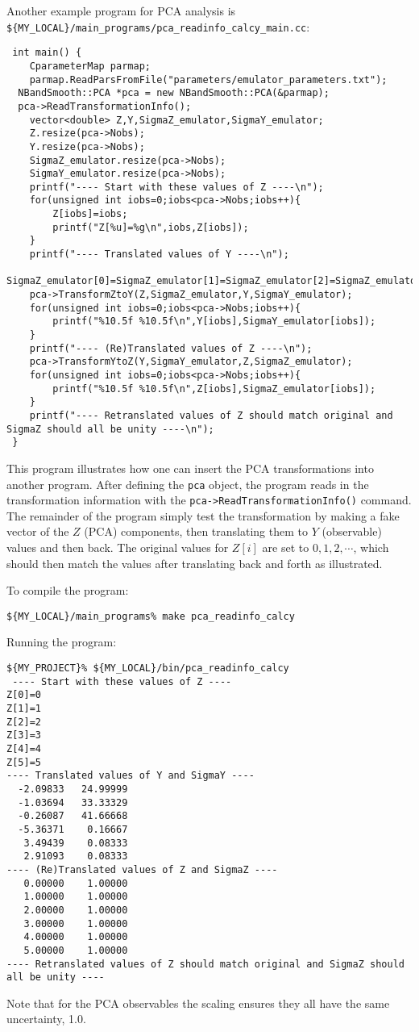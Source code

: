 \documentclass[UserManual.tex]{subfiles}
\begin{document}
Another example program for PCA analysis is {\tt \$\{MY\_LOCAL\}/main\_programs/pca\_readinfo\_calcy\_main.cc}:
{\tt\begin{verbatim}
 int main() {
	CparameterMap parmap;
	parmap.ReadParsFromFile("parameters/emulator_parameters.txt");
  NBandSmooth::PCA *pca = new NBandSmooth::PCA(&parmap);
  pca->ReadTransformationInfo();
	vector<double> Z,Y,SigmaZ_emulator,SigmaY_emulator;
	Z.resize(pca->Nobs);
	Y.resize(pca->Nobs);
	SigmaZ_emulator.resize(pca->Nobs);
	SigmaY_emulator.resize(pca->Nobs);
	printf("---- Start with these values of Z ----\n");
	for(unsigned int iobs=0;iobs<pca->Nobs;iobs++){
		Z[iobs]=iobs;
		printf("Z[%u]=%g\n",iobs,Z[iobs]);
	}
	printf("---- Translated values of Y ----\n");
	SigmaZ_emulator[0]=SigmaZ_emulator[1]=SigmaZ_emulator[2]=SigmaZ_emulator[3]=SigmaZ_emulator[4]=SigmaZ_emulator[5]=1.0;	
	pca->TransformZtoY(Z,SigmaZ_emulator,Y,SigmaY_emulator);
	for(unsigned int iobs=0;iobs<pca->Nobs;iobs++){
		printf("%10.5f %10.5f\n",Y[iobs],SigmaY_emulator[iobs]);
	}
	printf("---- (Re)Translated values of Z ----\n");
	pca->TransformYtoZ(Y,SigmaY_emulator,Z,SigmaZ_emulator);
	for(unsigned int iobs=0;iobs<pca->Nobs;iobs++){
		printf("%10.5f %10.5f\n",Z[iobs],SigmaZ_emulator[iobs]);
	}
	printf("---- Retranslated values of Z should match original and SigmaZ should all be unity ----\n");
 }
\end{verbatim}}
This program illustrates how one can insert the PCA transformations into another program. After defining the {\tt pca} object, the program reads in the transformation information with the {\tt pca->ReadTransformationInfo()} command. The remainder of the program simply test the transformation by  making a fake vector of the $Z$ (PCA) components, then translating them to $Y$ (observable) values and then back. The original values for $Z[i]$ are set to $0,1,2,\cdots$, which should then match the values after translating back and forth as illustrated. 

To compile the program:
{\tt\begin{verbatim}
${MY_LOCAL}/main_programs% make pca_readinfo_calcy
\end{verbatim}}
Running the program:
{\tt\begin{verbatim}
${MY_PROJECT}% ${MY_LOCAL}/bin/pca_readinfo_calcy
 ---- Start with these values of Z ----
Z[0]=0
Z[1]=1
Z[2]=2
Z[3]=3
Z[4]=4
Z[5]=5
---- Translated values of Y and SigmaY ----
  -2.09833   24.99999
  -1.03694   33.33329
  -0.26087   41.66668
  -5.36371    0.16667
   3.49439    0.08333
   2.91093    0.08333
---- (Re)Translated values of Z and SigmaZ ----
   0.00000    1.00000
   1.00000    1.00000
   2.00000    1.00000
   3.00000    1.00000
   4.00000    1.00000
   5.00000    1.00000
---- Retranslated values of Z should match original and SigmaZ should all be unity ----
\end{verbatim}}
Note that for the PCA observables the scaling ensures they all have the same uncertainty, 1.0. 
\end{document}
